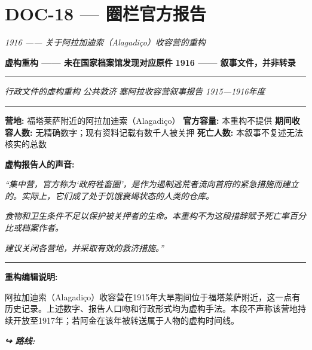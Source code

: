\section*{\textbf{DOC-18} --- 圈栏官方报告}

\noindent \textit{1916 —— 关于阿拉加迪索（Alagadiço）收容营的重构}

\noindent \textbf{虚构重构 —— 未在国家档案馆发现对应原件}
\textbf{1916 —— 叙事文件，并非转录}

\vspace{0.5em}\noindent\rule{\textwidth}{0.5pt}\vspace{0.5em}

\noindent \textit{行政文件的虚构重构}
\textit{公共救济}
\textit{塞阿拉收容营叙事报告}
\textit{1915—1916年度}

\vspace{0.5em}\noindent\rule{\textwidth}{0.5pt}\vspace{0.5em}

\noindent \textbf{营地:} 福塔莱萨附近的阿拉加迪索（Alagadiço）
\textbf{官方容量:} 本重构不提供
\textbf{期间收容人数:} 无精确数字；现有资料记载有数千人被关押
\textbf{死亡人数:} 本叙事不复述无法核实的总数

\noindent \textbf{虚构报告人的声音:}

\noindent \textit{“集中营，官方称为‘政府牲畜圈’，是作为遏制逃荒者流向首府的紧急措施而建立的。实际上，它们成了处于饥饿衰竭状态的人类的仓库。}

\noindent \textit{食物和卫生条件不足以保护被关押者的生命。本重构不为这段措辞赋予死亡率百分比或档案作者。}

\noindent \textit{建议关闭各营地，并采取有效的救济措施。”}

\vspace{0.5em}\noindent\rule{\textwidth}{0.5pt}\vspace{0.5em}

\noindent \textbf{重构编辑说明:}

\noindent 阿拉加迪索（Alagadiço）收容营在1915年大旱期间位于福塔莱萨附近，这一点有历史记录。上述数字、报告人口吻和行政形式均为虚构手法。本段不声称该营地持续开放至1917年；若阿金在该年被转送属于人物的虚构时间线。

\vspace{0.5em}
\noindent\textit{\textbf{↪ 路线:}  \rotasep {}}
